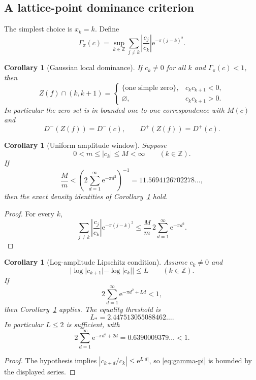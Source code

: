 \documentclass[11pt]{article}
\newtheorem{corollary}[theorem]{Corollary}
\newcommand{\Z}{\mathbb{Z}}
\newcommand{\e}{\mathrm{e}}
\begin{document}
\subsection{A lattice-point dominance criterion}
The simplest choice is $x_k=k$. Define
\begin{equation}\label{eq:gamma-pi}
 \Gamma_\pi(c)=\sup_{k\in\Z}
 \sum_{j\neq k}\left|\frac{c_j}{c_k}\right|\e^{-\pi(j-k)^2}.
\end{equation}

\begin{corollary}[Gaussian local dominance]\label{cor:local-dominance}
If $c_k\neq0$ for all $k$ and $\Gamma_\pi(c)<1$, then
\[
 Z(f)\cap(k,k+1)=
 \begin{cases}
 \{\text{one simple zero}\}, & c_kc_{k+1}<0,\\
 \varnothing, & c_kc_{k+1}>0.
 \end{cases}
\]
In particular the zero set is in bounded one-to-one correspondence with $M(c)$ and
\[
 D^-(Z(f))=D^-(c),\qquad D^+(Z(f))=D^+(c).
\]
\end{corollary}

\begin{corollary}[Uniform amplitude window]\label{cor:amplitude-window}
Suppose
\[
 0<m\le|c_k|\le M<\infty\qquad(k\in\Z).
\]
If
\begin{equation}\label{eq:amplitude-threshold}
 \frac{M}{m}<
 \left(2\sum_{d=1}^{\infty}\e^{-\pi d^2}\right)^{-1}
 =11.5694126702278\ldots,
\end{equation}
then the exact density identities of Corollary~\ref{cor:local-dominance} hold.
\end{corollary}

\begin{proof}
For every $k$,
\[
 \sum_{j\neq k}\left|\frac{c_j}{c_k}\right|\e^{-\pi(j-k)^2}
 \le\frac{M}{m}\,2\sum_{d=1}^{\infty}\e^{-\pi d^2}.
\]
\end{proof}

\begin{corollary}[Log-amplitude Lipschitz condition]\label{cor:log-lipschitz}
Assume $c_k\neq0$ and
\[
 |\log|c_{k+1}|-\log|c_k||\le L\qquad(k\in\Z).
\]
If
\[
 2\sum_{d=1}^{\infty}\e^{-\pi d^2+Ld}<1,
\]
then Corollary~\ref{cor:local-dominance} applies. The equality threshold is
\[
 L_*=2.447513055088462\ldots.
\]
In particular $L\le2$ is sufficient, with
\[
 2\sum_{d=1}^{\infty}\e^{-\pi d^2+2d}
 =0.6390009379\ldots<1.
\]
\end{corollary}

\begin{proof}
The hypothesis implies $|c_{k+d}/c_k|\le\e^{L|d|}$, so \eqref{eq:gamma-pi} is bounded by the displayed series.
\end{proof}
\end{document}
